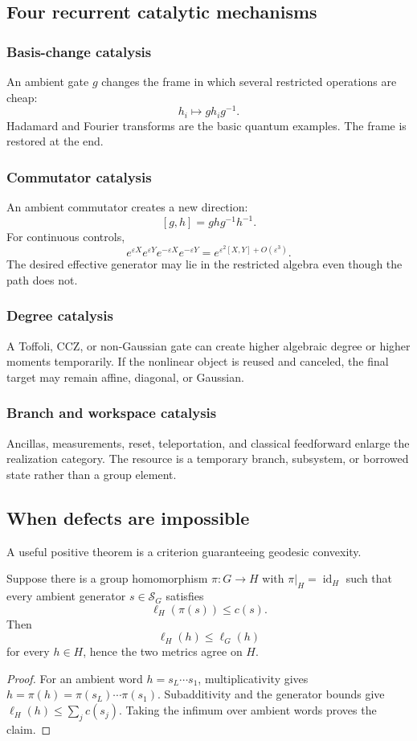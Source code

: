 \subsection{Four recurrent catalytic mechanisms}
\subsubsection{Basis-change catalysis}
An ambient gate $g$ changes the frame in which several restricted operations are cheap:
\[
h_i\mapsto gh_ig^{-1}.
\]
Hadamard and Fourier transforms are the basic quantum examples.  The frame is restored at the end.

\subsubsection{Commutator catalysis}
An ambient commutator creates a new direction:
\[
[g,h]=ghg^{-1}h^{-1}.
\]
For continuous controls,
\[
e^{\varepsilon X}e^{\varepsilon Y}e^{-\varepsilon X}e^{-\varepsilon Y}
=
e^{\varepsilon^2[X,Y]+O(\varepsilon^3)}.
\]
The desired effective generator may lie in the restricted algebra even though the path does not.

\subsubsection{Degree catalysis}
A Toffoli, CCZ, or non-Gaussian gate can create higher algebraic degree or higher moments temporarily.  If the nonlinear object is reused and canceled, the final target may remain affine, diagonal, or Gaussian.

\subsubsection{Branch and workspace catalysis}
Ancillas, measurements, reset, teleportation, and classical feedforward enlarge the realization category.  The resource is a temporary branch, subsystem, or borrowed state rather than a group element.

\subsection{When defects are impossible}
A useful positive theorem is a criterion guaranteeing geodesic convexity.
\begin{proposition}
Suppose there is a group homomorphism $\pi:G\to H$ with $\pi|_H=\operatorname{id}_H$ such that every ambient generator $s\in\mathcal S_G$ satisfies
\[
\ell_H(\pi(s))\le c(s).
\]
Then
\[
\ell_H(h)\le\ell_G(h)
\]
for every $h\in H$, hence the two metrics agree on $H$.
\end{proposition}
\begin{proof}
For an ambient word $h=s_L\cdots s_1$, multiplicativity gives $h=\pi(h)=\pi(s_L)\cdots\pi(s_1)$.  Subadditivity and the generator bounds give $\ell_H(h)\le\sum_j c(s_j)$.  Taking the infimum over ambient words proves the claim.
\end{proof}

